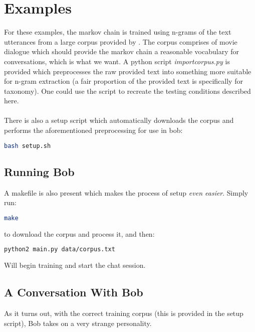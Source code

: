 \documentclass[]{article}
\begin{document}
\section{Examples}

For these examples, the markov chain is trained using n-grams of the text utterances from a large corpus provided by \cite{Danescu-Niculescu-Mizil+Lee:11a}. The corpus comprises of movie dialogue which should provide the markov chain a reasonable vocabulary for conversations, which is what we want. A python script \emph{importcorpus.py} is provided which preprocesses the raw provided text into something more suitable for n-gram extraction (a fair proportion of the provided text is specifically for taxonomy). One could use the script to recreate the testing conditions described here.
\\\\
There is also a setup script which automatically downloads the corpus and performs the aforementioned preprocessing for use in bob:
\begin{lstlisting}[language=bash, frame=single]
bash setup.sh
\end{lstlisting}

\subsection{Running Bob}

A makefile is also present which makes the process of setup \emph{even easier}. Simply run:

\begin{lstlisting}[language=bash, frame=single]
make
\end{lstlisting}

to download the corpus and process it, and then:

\begin{lstlisting}[language=bash, frame=single]
python2 main.py data/corpus.txt
\end{lstlisting}

Will begin training and start the chat session.

\subsection{A Conversation With Bob}

As it turns out, with the correct training corpus (this is provided in the setup script), Bob takes on a very strange personality.
\end{document}
